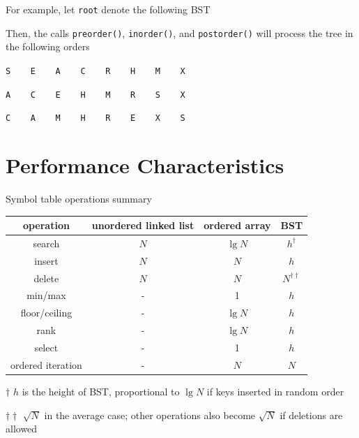 \documentclass[8pt,a4paper,compress]{beamer}
\begin{document}
\begin{frame}[fragile]
\pause

For example, let \lstinline{root} denote the following BST
\begin{center}
\end{center}

\pause
\bigskip

Then, the calls \lstinline{preorder()}, \lstinline{inorder()}, and \lstinline{postorder()} will process the tree in the following orders

\begin{center}
\lstinline{S    E    A    C    R    H    M    X}

\bigskip

\lstinline{A    C    E    H    M    R    S    X}

\bigskip

\lstinline{C    A    M    H    R    E    X    S}
\end{center}
\end{frame}

\section{Performance Characteristics}
\begin{frame}[fragile]
\pause

Symbol table operations summary
\begin{center}
\begin{tabular}{cccc}
operation & unordered linked list & ordered array & BST \\ \hline
search & $N$ & $\lg N$ & $h^\dagger$ \\
insert & $N$ & $N$ & $h$ \\
delete & $N$ & $N$ & $N^{\dagger\dagger}$ \\
min/max & - & 1 & $h$ \\
floor/ceiling & - & $\lg N$ & $h$\\
rank & - & $\lg N$ & $h$ \\
select & - & 1 & $h$ \\
ordered iteration & - & $N$ & $N$ 
\end{tabular} 

\bigskip

\tiny $\dagger$ $h$ is the height of BST, proportional to $\lg N$ if keys inserted in random order

$\dagger\dagger$ $\sqrt{N}$ in the average case; other operations also become $\sqrt{N}$ if deletions are allowed
\end{center}
\end{frame}
\end{document}
